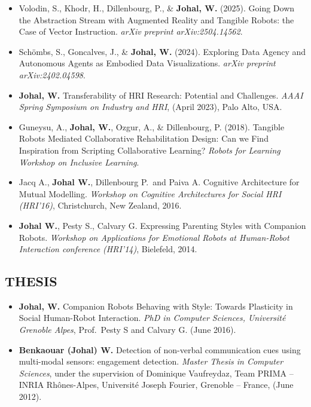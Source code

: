 \begin{itemize}[nosep]
    \renewcommand\labelitemi{$\bullet$}
    \item Volodin, S., Khodr, H., Dillenbourg, P., \& \textbf{Johal, W.} (2025). Going Down the Abstraction Stream with Augmented Reality and Tangible Robots: the Case of Vector Instruction. \textit{arXiv preprint arXiv:2504.14562}.

    \item Schömbs, S., Goncalves, J., \& \textbf{Johal, W.} (2024). Exploring Data Agency and Autonomous Agents as Embodied Data Visualizations. \textit{arXiv preprint arXiv:2402.04598}.

    \item \textbf{Johal, W.} Transferability of HRI Research: Potential and Challenges. \textit{AAAI Spring Symposium on Industry and HRI}, (April 2023), Palo Alto, USA.

    \item Guneysu, A., \textbf{Johal, W.}, Ozgur, A., \& Dillenbourg, P. (2018). Tangible Robots Mediated Collaborative Rehabilitation Design: Can we Find Inspiration from Scripting Collaborative Learning? \textit{Robots for Learning Workshop on Inclusive Learning}.

    \item Jacq A., \textbf{Johal W.}, Dillenbourg P.\ and Paiva A. Cognitive Architecture for Mutual Modelling. \textit{Workshop on Cognitive Architectures for Social HRI (HRI'16)}, Christchurch, New Zealand, 2016.

    \item \textbf{Johal W.}, Pesty S., Calvary G. Expressing Parenting Styles with Companion Robots. \textit{Workshop on Applications for Emotional Robots at Human-Robot Interaction conference (HRI'14)}, Bielefeld, 2014.
\end{itemize}

\vspace{0.1in}

\subsection{THESIS}
\vspace{2pt}

\begin{itemize}[nosep]
    \renewcommand\labelitemi{$\bullet$}
    \item \textbf{Johal, W.} Companion Robots Behaving with Style: Towards Plasticity in Social Human-Robot Interaction. \textit{PhD in Computer Sciences, Université Grenoble Alpes}, Prof.\ Pesty S and Calvary G. (June 2016).
    \item \textbf{Benkaouar (Johal) W.} Detection of non-verbal communication cues using multi-modal sensors: engagement detection. \textit{Master Thesis in Computer Sciences}, under the supervision of Dominique Vaufreydaz, Team PRIMA -- INRIA Rhônes-Alpes, Université Joseph Fourier, Grenoble -- France, (June 2012).
\end{itemize}
